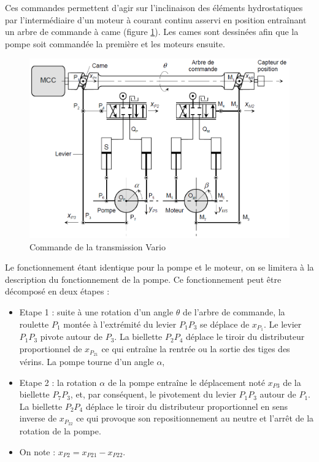 Ces commandes permettent d'agir sur l'inclinaison des éléments hydrostatiques par l'intermédiaire d'un moteur à courant continu asservi en position entraînant un arbre de commande à came (figure \ref{fig20}). Les cames sont dessinées afin que la pompe soit commandée la première et les moteurs ensuite.

\begin{figure}[!h]
\centering\includegraphics[width=.8\linewidth]{img/Tracteur20.png}
\caption{Commande de la transmission Vario}
\label{fig20}
\end{figure}

Le fonctionnement étant identique pour la pompe et le moteur, on se limitera à la description du fonctionnement de la pompe. Ce fonctionnement peut être décomposé en deux étapes :
\begin{itemize}
 \item Etape 1 : suite à une rotation d'un angle $\theta$ de l'arbre de commande, la roulette $P_1$ montée à l'extrémité du levier $P_{1}P_{3}$ se déplace de $x_{P_1}$. Le levier $P_{1}P_{3}$ pivote autour de $P_3$. La biellette $P_{2}P_{4}$ déplace le tiroir du distributeur proportionnel de $x_{P_{21}}$ ce qui entraîne la rentrée ou la sortie des tiges des vérins. La pompe tourne d'un angle $\alpha$,
 \item Etape 2 : la rotation $\alpha$ de la pompe entraîne le déplacement noté $x_{P3}$ de la biellette $P_{7}P_{3}$, et, par conséquent, le pivotement du levier $P_{1}P_{3}$ autour de $P_1$. La biellette $P_{2}P_{4}$
déplace le tiroir du distributeur proportionnel en sens inverse de $x_{P_{22}}$ ce qui provoque son repositionnement au neutre et l'arrêt de la rotation de la pompe.
 \item On note : $x_{P2}=x_{P21}-x_{P22}$.
\end{itemize}


